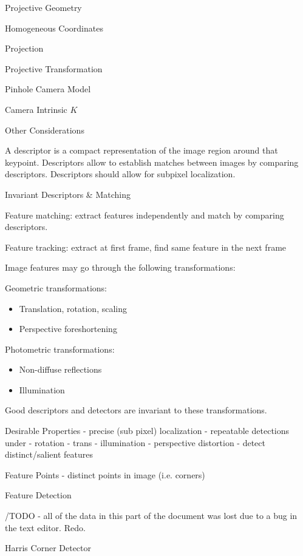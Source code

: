 \begin{section}
\begin{subsubsection}
\begin{subsubsection}
\begin{subsubsection}
\begin{section}{Projective Geometry}
\begin{subsection}{Homogeneous Coordinates}
\begin{subsubsection}
{\begin{subsubsection}{Projection}
\begin{subsubsection}{Projective Transformation}
\begin{subsection}
\begin{subsubsection}
\begin{subsubsection}
\begin{subsubsection}
{\begin{subsubsection}
\begin{subsection}
\begin{subsection} {Pinhole Camera Model}
\begin{subsection} {Camera Intrinsic $K$}
\begin{subsection}
\begin{subsection}
\begin{subsubsection}{Other Considerations}
{A descriptor is a compact representation of the image region around that keypoint.
Descriptors allow to establish matches between images by comparing descriptors.
Descriptors should allow for subpixel localization.

\begin{subsection} Invariant Descriptors & Matching

Feature matching: extract features independently and match by comparing descriptors.

Feature tracking: extract at first frame, find same feature in the next frame

Image features may go through the following transformations:

Geometric transformations:
\begin{itemize}
\item Translation, rotation, scaling
\item Perspective foreshortening 
\end{itemize}


Photometric transformations:
\begin{itemize}
\item Non-diffuse reflections 
\item Illumination
\end{itemize}

Good descriptors and detectors are invariant to these transformations.

\begin{subsubsection}{Desirable Properties}
- precise (sub pixel) localization
- repeatable detections under 
  - rotation
  - trans
  - illumination
  - perspective distortion
- detect distinct/salient features

Feature Points - distinct points in image (i.e. corners)

\begin{section} Feature Detection

/TODO - all of the data in this part of the document was lost due to a bug in the text editor. Redo.

\begin{subsection} Harris Corner Detector


\end{subsection}
\end{section}
\end{subsubsection}
\end{subsection}}
\end{subsubsection}
\end{subsection}
\end{subsection}
\end{subsection}
\end{subsection}
\end{subsection}
\end{subsubsection}}
\end{subsubsection}
\end{subsubsection}
\end{subsubsection}
\end{subsection}
\end{subsubsection}
\end{subsubsection}}
\end{subsubsection}
\end{subsection}
\end{section}
\end{subsubsection}
\end{subsubsection}
\end{subsubsection}
\end{section}
